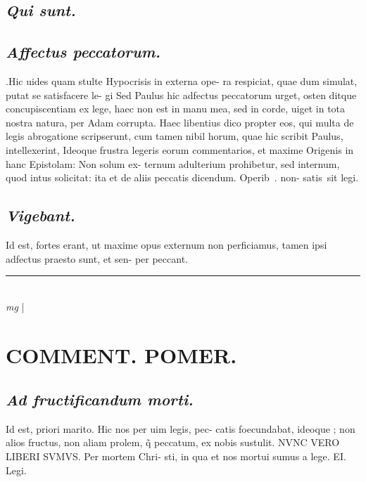 \documentclass{article}
\begin{document}
\begin{pages}
\subsection*{\textit{Qui sunt. }}
{}
\subsection*{\textit{Affectus peccatorum. }}\pstart .Hic uides quam stulte Hypocrisis in externa ope- ra respiciat, quae dum simulat, putat se satisfacere le- gi Sed Paulus hic adfectus peccatorum urget, osten ditque concupiscentiam ex lege, haec non est in manu mea, sed in corde, uiget in tota nostra natura, per Adam corrupta. Haec libentius dico propter eos, qui multa de legis abrogatione scripserunt, cum tamen nibil horum, quae hic scribit Paulus, intellexerint, Ideoque frustra legeris eorum commentarios, et maxime Origenis in hanc Epistolam: Non solum ex- ternum adulterium prohibetur, sed internum, quod intus solicitat: ita et de aliis peccatis dicendum.  Operib . non- satis sit legi.  \pend
{}
{}
\subsection*{\textit{Vigebant. }}\pstart Id est, fortes erant, ut maxime opus externum non perficiamus, tamen ipsi adfectus praesto sunt, et sen- per peccant.   \pend
\vspace{0.5cm}\noindent
\vspace{0.2cm}\rule{1cm}{0.2pt}\\ 
\hspace{0.2cm}\textit{mg}
\footnotesize 
\normalsize| 
\section*{COMMENT. POMER.  }
{}
\subsection*{\textit{Ad fructificandum morti. }}\pstart Id est, priori marito. Hic nos per uim legis, pec- catis foecundabat, ideoque ; non alios fructus, non aliam prolem, q̃ peccatum, ex nobis sustulit. NVNC VERO LIBERI SVMVS. Per mortem Chri- sti, in qua et nos mortui sumus a lege. EI. Legi.   \pend
{}
{}

\end{pages}
\end{document}
